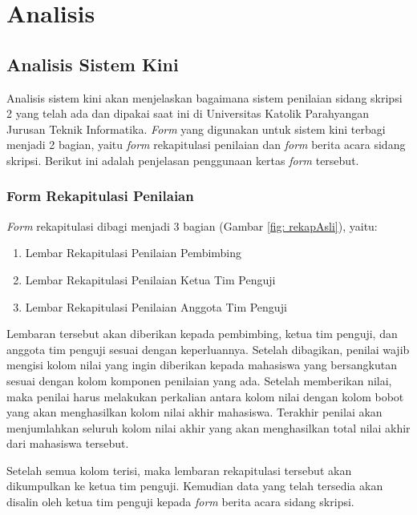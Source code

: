 \chapter{Analisis}
\label{chap: analisis}

\section{Analisis Sistem Kini}
\label{sec: analisiSKini}

Analisis sistem kini akan menjelaskan bagaimana sistem penilaian sidang skripsi 2 yang telah ada dan dipakai saat ini di Universitas Katolik Parahyangan Jurusan Teknik Informatika. \textit{Form} yang digunakan untuk sistem kini terbagi menjadi 2 bagian, yaitu \textit{form} rekapitulasi penilaian dan \textit{form} berita acara sidang skripsi. Berikut ini adalah penjelasan penggunaan kertas \textit{form} tersebut.

	\subsection{Form Rekapitulasi Penilaian}
	\label{sub: rekapPenil}
	
	\textit{Form} rekapitulasi dibagi menjadi 3 bagian (Gambar \ref{fig: rekapAsli}), yaitu:
		\begin{enumerate}
			\item Lembar Rekapitulasi Penilaian Pembimbing
			\item Lembar Rekapitulasi Penilaian Ketua Tim Penguji
			\item Lembar Rekapitulasi Penilaian Anggota Tim Penguji
		\end{enumerate}
	
	Lembaran tersebut akan diberikan kepada pembimbing, ketua tim penguji, dan anggota tim penguji sesuai dengan keperluannya. Setelah dibagikan, penilai wajib mengisi kolom nilai yang ingin diberikan kepada mahasiswa yang bersangkutan sesuai dengan kolom komponen penilaian yang ada. Setelah memberikan nilai, maka penilai harus melakukan perkalian antara kolom nilai dengan kolom bobot yang akan menghasilkan kolom nilai akhir mahasiswa. Terakhir penilai akan menjumlahkan seluruh kolom nilai akhir yang akan menghasilkan total nilai akhir dari mahasiswa tersebut.
	
	Setelah semua kolom terisi, maka lembaran rekapitulasi tersebut akan dikumpulkan ke ketua tim penguji. Kemudian data yang telah tersedia akan disalin oleh ketua tim penguji kepada \textit{form} berita acara sidang skripsi.
	
